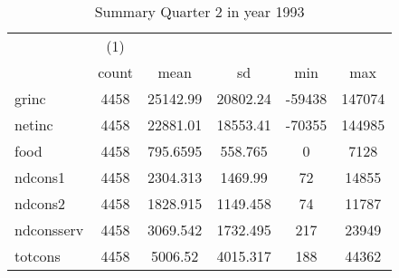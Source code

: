 \begin{table}[htbp]\centering
\def\sym#1{\ifmmode^{#1}\else\(^{#1}\)\fi}
\caption{Summary Quarter 2 in year 1993 \label{sum\_Q2\_y1993}}
\begin{tabular}{l*{1}{ccccc}}
\hline\hline
            &\multicolumn{1}{c}{(1)}&            &            &            &            \\
            &       count&        mean&          sd&         min&         max\\
\hline
grinc       &        4458&    25142.99&    20802.24&      -59438&      147074\\
netinc      &        4458&    22881.01&    18553.41&      -70355&      144985\\
food        &        4458&    795.6595&     558.765&           0&        7128\\
ndcons1     &        4458&    2304.313&     1469.99&          72&       14855\\
ndcons2     &        4458&    1828.915&    1149.458&          74&       11787\\
ndconsserv  &        4458&    3069.542&    1732.495&         217&       23949\\
totcons     &        4458&     5006.52&    4015.317&         188&       44362\\
\hline\hline
\end{tabular}
\end{table}
